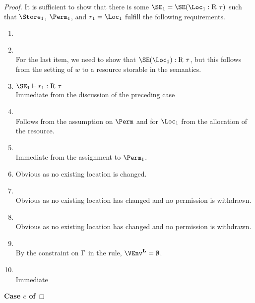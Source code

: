 \begin{proof}
  It is sufficient to show that there is some $\SE_1 = \SE(\Loc_1 :
  \tapp\tres\tau)$ such that  
  $\Store_1$, $\Perm_1$, and $r_1 = \Loc_1$ fulfill the following requirements.
  \begin{enumerate}[({R}1)]
  \item {}
  \item {} \\
    For the last item, we need to show that $\SE (\Loc_1) :
    \tapp\tres\tau$, but this follows from the setting of $w$ to a
    resource storable in the semantics.
  \item $\SE_1 \vdash r_1 : \tapp\tres\tau$ \\
    Immediate from the discussion of the preceding case
  \item {} \\
    Follows from the assumption on $\Perm$ and for $\Loc_1$ from the
    allocation of the resource.
  \item {} \\
    Immediate from the assignment to $\Perm_1$.
  \item {} 
    Obvious as no existing location is changed.
  \item {} \\
    Obvious as no existing location has changed and no permission is withdrawn.
  \item {} \\
    Obvious as no existing location has changed and no permission is
    withdrawn.
  \item {} \\
    By the constraint on $\Gamma$ in the  rule, $\Active\VEnv = \emptyset$.
  \item {} \\
    Immediate
  \end{enumerate}
  
  \newpage
  \textbf{Case $e$ of}


\end{proof}
